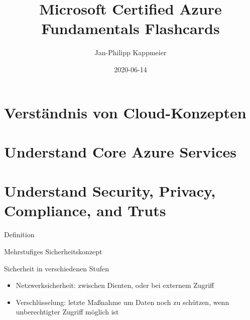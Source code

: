 \documentclass{scrartcl}
\newenvironment{flashcard}[2][]{%
    #1
    \vfill
    \centerline{\Large{#2}}
    \vfill
\newpage
}
{\newpage}
\newcommand{\sectioncard}[1]{
    \vspace*{\stretch{1}}
    \section{#1}
    \vspace*{\stretch{1}}
    \pagebreak
}
\begin{document}
    \title{Microsoft Certified Azure Fundamentals Flashcards}
    \date{2020-06-14}
    \author{Jan-Philipp Kappmeier}

    \clearpage\maketitle
    \thispagestyle{empty}
    \pagebreak

    \sectioncard{Verständnis von Cloud-Konzepten}

    
    
    

    

    \sectioncard{Understand Core Azure Services}

    

    

    

    

    \sectioncard{Understand Security, Privacy, Compliance, and Truts}

    \begin{flashcard}[Definition]{Mehrstufiges Sicherheitskonzept}
        Sicherheit in verschiedenen Stufen
        \begin{itemize}
            \item Netzwerksicherheit: zwischen Dienten, oder bei externem Zugriff
            \item Verschlüsselung: letzte Maßnahme um Daten noch zu schützen, wenn unberechtigter Zugriff möglich ist
        \end{itemize}
    \end{flashcard}

    
\end{document}
